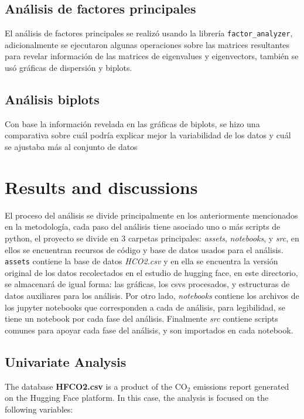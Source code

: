 \documentclass[journal]{IEEEtran}
\begin{document}
	\subsection{Análisis de factores principales}
	El análisis de factores principales se realizó usando la librería \texttt{factor\_analyzer}, adicionalmente se ejecutaron algunas operaciones sobre las matrices resultantes para revelar información de las matrices de eigenvalues y eigenvectors, también se usó gráficas de dispersión y biplots.


	\subsection{Análisis biplots}
	Con base la información revelada en las gráficas de biplots, se hizo una comparativa sobre cuál podría explicar mejor la variabilidad de los datos y cuál se ajustaba más al conjunto de datos

	\section{Results and discussions}

	\label{sec:results}
	El proceso del análisis se divide principalmente en los anteriormente mencionados en la metodología, cada paso del análisis tiene asociado uno o más scripts de python, el proyecto se divide en 3 carpetas principales: \textit{assets}, \textit{notebooks},  y \textit{src}, en ellos se encuentran recursos de código y base de datos usados para el análisis. \texttt{assets} contiene la base de datos \textit{HCO2.csv} y en ella se encuentra la versión original de los datos recolectados en el estudio de hugging face\cite{exploring_carbon_footprint}, en este directorio, se almacenará de igual forma: las gráficas, los csvs procesados, y estructuras de datos auxiliares para los análisis. Por otro lado, \textit{notebooks} contiene los archivos de los jupyter notebooks que corresponden a cada de análisis, para legibilidad, se tiene un notebook por cada fase del análisis. Finalmente  \textit{src} contiene scripts comunes para apoyar cada fase del análisis, y son importados en cada notebook.

	 \subsection{Univariate Analysis}
	 \label{ssec:unianal}
	 The database \textbf{HFCO2.csv} is a product of the $\text{CO}_2$ emissions report generated on the Hugging Face platform. In this case, the analysis is focused on the following variables:
\end{document}
